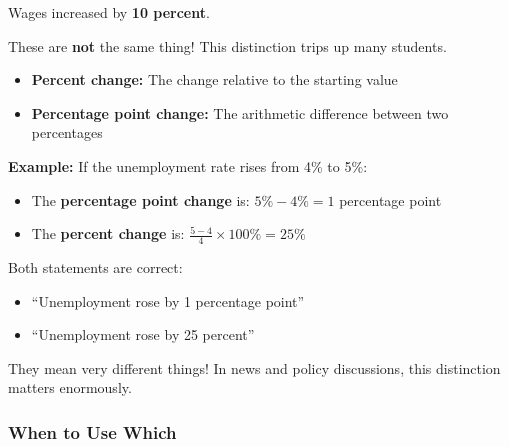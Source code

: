 \documentclass[
  letterpaper,
  DIV=11,
  numbers=noendperiod]{scrreprt}
\providecommand{\tightlist}{%
  \setlength{\itemsep}{0pt}\setlength{\parskip}{0pt}}
\begin{document}
Wages increased by \textbf{10 percent}.

\begin{tcolorbox}[enhanced jigsaw, arc=.35mm, bottomrule=.15mm, bottomtitle=1mm, breakable, colback=white, colbacktitle=quarto-callout-warning-color!10!white, colframe=quarto-callout-warning-color-frame, coltitle=black, left=2mm, leftrule=.75mm, opacityback=0, opacitybacktitle=0.6, rightrule=.15mm, title=\textcolor{quarto-callout-warning-color}{\faExclamationTriangle}\hspace{0.5em}{Percent Change vs.~Percentage Point Change}, titlerule=0mm, toprule=.15mm, toptitle=1mm]

These are \textbf{not} the same thing! This distinction trips up many
students.

\begin{itemize}
\tightlist
\item
  \textbf{Percent change:} The change relative to the starting value
\item
  \textbf{Percentage point change:} The arithmetic difference between
  two percentages
\end{itemize}

\textbf{Example:} If the unemployment rate rises from 4\% to 5\%:

\begin{itemize}
\tightlist
\item
  The \textbf{percentage point change} is: \(5\% - 4\% = 1\) percentage
  point
\item
  The \textbf{percent change} is:
  \(\frac{5 - 4}{4} \times 100\% = 25\%\)
\end{itemize}

Both statements are correct:

\begin{itemize}
\tightlist
\item
  ``Unemployment rose by 1 percentage point''
\item
  ``Unemployment rose by 25 percent''
\end{itemize}

They mean very different things! In news and policy discussions, this
distinction matters enormously.

\end{tcolorbox}

\subsubsection{When to Use Which}\label{when-to-use-which}
\end{document}

